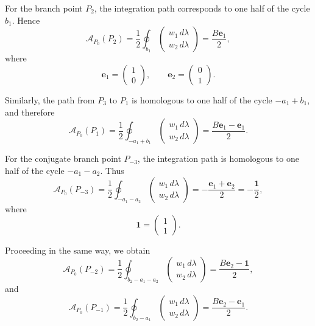 \documentclass{amsart}
\numberwithin{equation}{hw}
\begin{document}
For the branch point \(P_2\), the integration path corresponds to one half of the cycle \(b_1\). Hence
\begin{equation}
\mathcal{A}_{P_0}(P_2)
=
\frac{1}{2}
\oint_{b_1}
\begin{pmatrix}
w_1\,d\lambda\\
w_2\,d\lambda
\end{pmatrix}
=
\frac{B\bm{e}_1}{2},
\label{eq:A-P2}
\end{equation}
where
\[
\bm{e}_1
=
\begin{pmatrix}
1\\
0
\end{pmatrix},
\qquad
\bm{e}_2
=
\begin{pmatrix}
0\\
1
\end{pmatrix}.
\]

Similarly, the path from \(P_3\) to \(P_1\) is homologous to one half of the cycle \(-a_1+b_1\), and therefore
\begin{equation}
\mathcal{A}_{P_0}(P_1)
=
\frac{1}{2}
\oint_{-a_1+b_1}
\begin{pmatrix}
w_1\,d\lambda\\
w_2\,d\lambda
\end{pmatrix}
=
\frac{B\bm{e}_1-\bm{e}_1}{2}.
\label{eq:A-P1}
\end{equation}

For the conjugate branch point \(P_{-3}\), the integration path is homologous to one half of the cycle \(-a_1-a_2\). Thus
\begin{equation}
\mathcal{A}_{P_0}(P_{-3})
=
\frac{1}{2}
\oint_{-a_1-a_2}
\begin{pmatrix}
w_1\,d\lambda\\
w_2\,d\lambda
\end{pmatrix}
=
-
\frac{\bm{e}_1+\bm{e}_2}{2}
=
-
\frac{\bm{1}}{2},
\label{eq:A-Pminus3}
\end{equation}
where
\[
\bm{1}
=
\begin{pmatrix}
1\\
1
\end{pmatrix}.
\]

Proceeding in the same way, we obtain
\begin{equation}
\mathcal{A}_{P_0}(P_{-2})
=
\frac{1}{2}
\oint_{b_2-a_1-a_2}
\begin{pmatrix}
w_1\,d\lambda\\
w_2\,d\lambda
\end{pmatrix}
=
\frac{B\bm{e}_2-\bm{1}}{2},
\label{eq:A-Pminus2}
\end{equation}
and
\begin{equation}
\mathcal{A}_{P_0}(P_{-1})
=
\frac{1}{2}
\oint_{b_2-a_1}
\begin{pmatrix}
w_1\,d\lambda\\
w_2\,d\lambda
\end{pmatrix}
=
\frac{B\bm{e}_2-\bm{e}_1}{2}.
\label{eq:A-Pminus1}
\end{equation}
\end{document}

